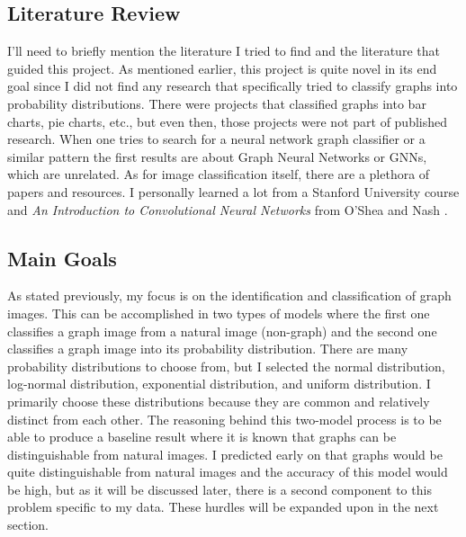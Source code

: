 \documentclass[12pt]{article}
\begin{document}
            
        \subsection{Literature Review}  

            I’ll need to briefly mention the literature I tried to find and the literature that guided this project. 
            As mentioned earlier, this project is quite novel in its end goal 
            since I did not find any research that specifically tried to classify graphs into probability distributions. 
            There were projects that classified graphs into bar charts, pie charts, etc., but even then, 
            those projects were not part of published research. 
            When one tries to search for a neural network graph classifier 
            or a similar pattern the first results are about Graph Neural Networks or GNNs, 
            which are unrelated. As for image classification itself, there are a plethora of papers and resources. 
            I personally learned a lot from a Stanford University course \cite{cs231n2023} 
            and \textit{An Introduction to Convolutional Neural Networks} from O’Shea and Nash \cite{oshea2015}.


        \subsection{Main Goals}

            As stated previously, my focus is on the identification and classification of graph images. 
            This can be accomplished in two types of models where the first one classifies a graph image from a natural image (non-graph) 
            and the second one classifies a graph image into its probability distribution. 
            There are many probability distributions to choose from, but I selected the normal distribution, 
            log-normal distribution, exponential distribution, and uniform distribution. 
            I primarily choose these distributions because they are common and relatively distinct from each other. 
            The reasoning behind this two-model process is to be able to produce a baseline result 
            where it is known that graphs can be distinguishable from natural images. 
            I predicted early on that graphs would be quite distinguishable from natural images and the accuracy of this model would be high, 
            but as it will be discussed later, there is a second component to this problem specific to my data. 
            These hurdles will be expanded upon in the next section.
\end{document}
